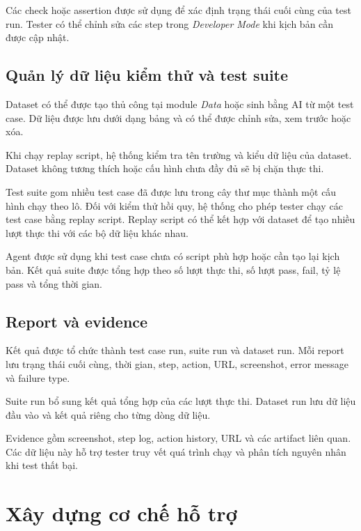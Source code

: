 Các check hoặc assertion được sử dụng để xác định trạng thái cuối cùng của test run. Tester có thể chỉnh sửa các step trong \textit{Developer Mode} khi kịch bản cần được cập nhật.

\subsection{Quản lý dữ liệu kiểm thử và test suite}

Dataset có thể được tạo thủ công tại module \textit{Data} hoặc sinh bằng AI từ một test case. Dữ liệu được lưu dưới dạng bảng và có thể được chỉnh sửa, xem trước hoặc xóa.

Khi chạy replay script, hệ thống kiểm tra tên trường và kiểu dữ liệu của dataset. Dataset không tương thích hoặc cấu hình chưa đầy đủ sẽ bị chặn thực thi.

Test suite gom nhiều test case đã được lưu trong cây thư mục thành một cấu hình chạy theo lô. Đối với kiểm thử hồi quy, hệ thống cho phép tester chạy các test case bằng replay script. Replay script có thể kết hợp với dataset để tạo nhiều lượt thực thi với các bộ dữ liệu khác nhau.

Agent được sử dụng khi test case chưa có script phù hợp hoặc cần tạo lại kịch bản. Kết quả suite được tổng hợp theo số lượt thực thi, số lượt pass, fail, tỷ lệ pass và tổng thời gian.

\subsection{Report và evidence}

Kết quả được tổ chức thành test case run, suite run và dataset run. Mỗi report lưu trạng thái cuối cùng, thời gian, step, action, URL, screenshot, error message và failure type.

Suite run bổ sung kết quả tổng hợp của các lượt thực thi. Dataset run lưu dữ liệu đầu vào và kết quả riêng cho từng dòng dữ liệu.

Evidence gồm screenshot, step log, action history, URL và các artifact liên quan. Các dữ liệu này hỗ trợ tester truy vết quá trình chạy và phân tích nguyên nhân khi test thất bại.

\section{Xây dựng cơ chế hỗ trợ}

